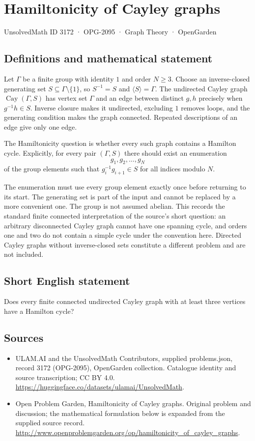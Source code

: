 \documentclass[11pt,a4paper]{article}
\begin{document}
\section*{Hamiltonicity of Cayley graphs}\label{3172}
{\small UnsolvedMath ID 3172 · OPG-2095 · Graph Theory · OpenGarden}
\subsection{Definitions and mathematical statement}
Let $\Gamma$ be a finite group with identity $1$ and order
$N\geq3$. Choose an inverse-closed generating set
$S\subseteq\Gamma\setminus\{1\}$, so $S^{-1}=S$ and
$\langle S\rangle=\Gamma$. The undirected Cayley graph
$\operatorname{Cay}(\Gamma,S)$ has vertex set $\Gamma$ and
an edge between distinct $g,h$ precisely when
$g^{-1}h\in S$. Inverse closure makes it undirected,
excluding $1$ removes loops, and the generating condition
makes the graph connected. Repeated descriptions of an edge
give only one edge.

The Hamiltonicity question is whether every such graph
contains a Hamilton cycle. Explicitly, for every pair
$(\Gamma,S)$ there should exist an enumeration
\[
 g_1,g_2,\ldots,g_N
\]
of the group elements such that $g_i^{-1}g_{i+1}\in S$
for all indices modulo $N$.

The enumeration must use every group element exactly once
before returning to its start. The generating set is part
of the input and cannot be replaced by a more convenient
one. The group is not assumed abelian. This records the
standard finite connected interpretation of the source's
short question: an arbitrary disconnected Cayley graph
cannot have one spanning cycle, and orders one and two
do not contain a simple cycle under the convention here.
Directed Cayley graphs without inverse-closed sets constitute
a different problem and are not included.
\subsection{Short English statement}
Does every finite connected undirected Cayley graph with at least three vertices have a Hamilton cycle?
\subsection{Sources}
\begin{itemize}
\item[S1] ULAM.AI and the UnsolvedMath Contributors, supplied problems.json, record 3172 (OPG-2095), OpenGarden collection. Catalogue identity and source transcription; CC BY 4.0.
\url{https://huggingface.co/datasets/ulamai/UnsolvedMath}.
\item[S2] Open Problem Garden, Hamiltonicity of Cayley graphs. Original problem and discussion; the mathematical formulation below is expanded from the supplied source record.
\url{http://www.openproblemgarden.org/op/hamiltonicity_of_cayley_graphs}.
\end{itemize}
\end{document}

